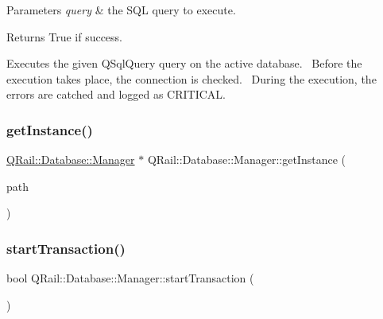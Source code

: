 \begin{DoxyParams}{Parameters}
{\em query} & the S\+QL query to execute. \\
\hline
\end{DoxyParams}
\begin{DoxyReturn}{Returns}
True if success.
\end{DoxyReturn}
Executes the given Q\+Sql\+Query query on the active database.~\newline
 Before the execution takes place, the connection is checked.~\newline
 During the execution, the errors are catched and logged as C\+R\+I\+T\+I\+C\+AL.~\newline
 \mbox{\label{classQRail_1_1Database_1_1Manager_af3059373b4500f85b00ce971c9f32298}} 
\subsubsection{\texorpdfstring{getInstance()}{getInstance()}}
{\footnotesize\ttfamily \mbox{\hyperlink{classQRail_1_1Database_1_1Manager}{Q\+Rail\+::\+Database\+::\+Manager}} $\ast$ Q\+Rail\+::\+Database\+::\+Manager\+::get\+Instance (\begin{DoxyParamCaption}\item[{const Q\+String \&}]{path }\end{DoxyParamCaption})\hspace{0.3cm}{\ttfamily [static]}}

\mbox{\label{classQRail_1_1Database_1_1Manager_a57d22c2b445cec8bbd43bf47fa2dd257}} 
\subsubsection{\texorpdfstring{startTransaction()}{startTransaction()}}
{\footnotesize\ttfamily bool Q\+Rail\+::\+Database\+::\+Manager\+::start\+Transaction (\begin{DoxyParamCaption}{ }\end{DoxyParamCaption})}



